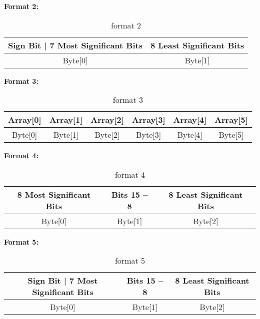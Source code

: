 \textbf{Format 2:}
\begin{table}[H]
    \centering
    {
    \begin{tabular}{|c|c|}
        \hline
        \rowcolor{black!8}
        \textbf{Sign Bit | 7 Most Significant Bits} & \textbf{8 Least Significant Bits} \\ \hline
        Byte[0] & Byte[1] \\ \hline
    \end{tabular}
    }
    \caption{format 2}
    \label{table:format2}
\end{table}


\textbf{Format 3:}
\begin{table}[H]
    \centering
    {
    \begin{tabular}{|c|c|c|c|c|c|}
        \hline
        \rowcolor{black!8}
        \textbf{Array[0]} & \textbf{Array[1]} & \textbf{Array[2]} & \textbf{Array[3]} & \textbf{Array[4]} & \textbf{Array[5]} \\ \hline
        Byte[0] & Byte[1] & Byte[2] & Byte[3] & Byte[4] & Byte[5] \\ \hline
    \end{tabular}
    }
    \caption{format 3}
    \label{table:format3}
\end{table}


\textbf{Format 4:}
\begin{table}[H]
    \centering
    {
    \begin{tabular}{|c|c|c|}
        \hline
        \rowcolor{black!8}
        \textbf{8 Most Significant Bits} & \textbf{Bits 15 -- 8} & \textbf{8 Least Significant Bits} \\ \hline
        Byte[0] & Byte[1] & Byte[2] \\ \hline
    \end{tabular}
    }
    \caption{format 4}
    \label{table:format4}
\end{table}


\textbf{Format 5:}
\begin{table}[H]
    \centering
    {
    \begin{tabular}{|c|c|c|}
        \hline
        \rowcolor{black!8}
        \textbf{Sign Bit | 7 Most Significant Bits} & \textbf{Bits 15 -- 8} & \textbf{8 Least Significant Bits} \\ \hline
        Byte[0] & Byte[1] & Byte[2] \\ \hline
    \end{tabular}
    }
    \caption{format 5}
    \label{table:format5}
\end{table}


